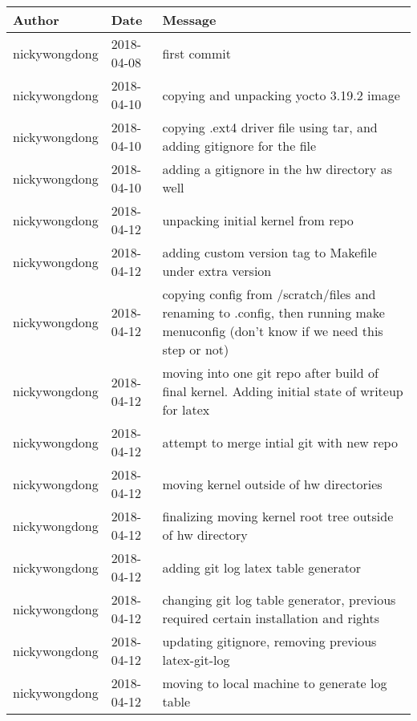 \documentclass[onecolumn, draftclsnofoot,10pt, compsoc]{IEEEtran}
\begin{document}
\begin{longtable} {|l|l|p{13cm}|}
    \hline
    \textbf{Author} & \textbf{Date} & \textbf{Message} \\ \hline
nickywongdong & 2018-04-08 & first commit \\ \hline
nickywongdong & 2018-04-10 & copying and unpacking yocto 3.19.2 image \\ \hline
nickywongdong & 2018-04-10 & copying .ext4 driver file using tar, and adding gitignore for the file \\ \hline
nickywongdong & 2018-04-10 & adding a gitignore in the hw directory as well \\ \hline
nickywongdong & 2018-04-12 & unpacking initial kernel from repo \\ \hline
nickywongdong & 2018-04-12 & adding custom version tag to Makefile under extra version \\ \hline
nickywongdong & 2018-04-12 & copying config from /scratch/files and renaming to .config, then running make menuconfig (don't know if we need this step or not) \\ \hline
nickywongdong & 2018-04-12 & moving into one git repo after build of final kernel. Adding initial state of writeup for latex \\ \hline
nickywongdong & 2018-04-12 & attempt to merge intial git with new repo \\ \hline
nickywongdong & 2018-04-12 & moving kernel outside of hw directories \\ \hline
nickywongdong & 2018-04-12 & finalizing moving kernel root tree outside of hw directory \\ \hline
nickywongdong & 2018-04-12 & adding git log latex table generator \\ \hline
nickywongdong & 2018-04-12 & changing git log table generator, previous required certain installation and rights \\ \hline
nickywongdong & 2018-04-12 & updating gitignore, removing previous latex-git-log \\ \hline
nickywongdong & 2018-04-12 & moving to local machine to generate log table \\ \hline
\end{longtable}
\end{document}
